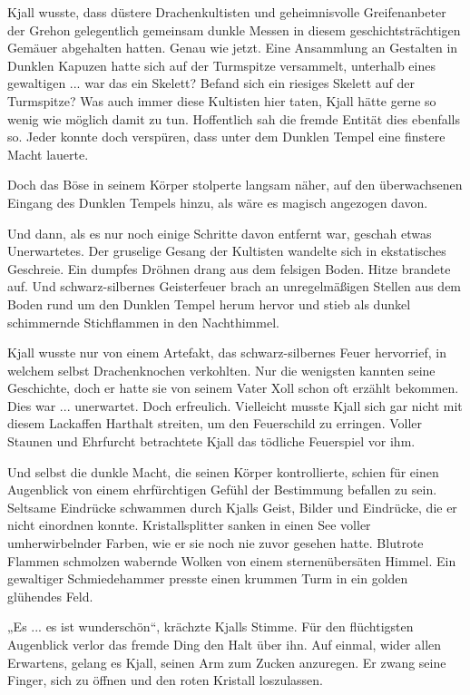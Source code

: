 Kjall wusste, dass düstere Drachenkultisten und geheimnisvolle Greifenanbeter der Grehon gelegentlich gemeinsam dunkle Messen in diesem geschichtsträchtigen Gemäuer abgehalten hatten. Genau wie jetzt. Eine Ansammlung an Gestalten in Dunklen Kapuzen hatte sich auf der Turmspitze versammelt, unterhalb eines gewaltigen ... war das ein Skelett? Befand sich ein riesiges Skelett auf der Turmspitze? Was auch immer diese Kultisten hier taten, Kjall hätte gerne so wenig wie möglich damit zu tun. Hoffentlich sah die fremde Entität dies ebenfalls so. Jeder konnte doch verspüren, dass unter dem Dunklen Tempel eine finstere Macht lauerte.

Doch das Böse in seinem Körper stolperte langsam näher, auf den überwachsenen Eingang des Dunklen Tempels hinzu, als wäre es magisch angezogen davon.

Und dann, als es nur noch einige Schritte davon entfernt war, geschah etwas Unerwartetes. Der gruselige Gesang der Kultisten wandelte sich in ekstatisches Geschreie. Ein dumpfes Dröhnen drang aus dem felsigen Boden. Hitze brandete auf. Und schwarz-silbernes Geisterfeuer brach an unregelmäßigen Stellen aus dem Boden rund um den Dunklen Tempel herum hervor und stieb als dunkel schimmernde Stichflammen in den Nachthimmel.

Kjall wusste nur von einem Artefakt, das schwarz-silbernes Feuer hervorrief, in welchem selbst Drachenknochen verkohlten. Nur die wenigsten kannten seine Geschichte, doch er hatte sie von seinem Vater Xoll schon oft erzählt bekommen. Dies war ... unerwartet. Doch erfreulich. Vielleicht musste Kjall sich gar nicht mit diesem Lackaffen Harthalt streiten, um den Feuerschild zu erringen. Voller Staunen und Ehrfurcht betrachtete Kjall das tödliche Feuerspiel vor ihm.

Und selbst die dunkle Macht, die seinen Körper kontrollierte, schien für einen Augenblick von einem ehrfürchtigen Gefühl der Bestimmung befallen zu sein. Seltsame Eindrücke schwammen durch Kjalls Geist, Bilder und Eindrücke, die er nicht einordnen konnte. Kristallsplitter sanken in einen See voller umherwirbelnder Farben, wie er sie noch nie zuvor gesehen hatte. Blutrote Flammen schmolzen wabernde Wolken von einem sternenübersäten Himmel. Ein gewaltiger Schmiedehammer presste einen krummen Turm in ein golden glühendes Feld.

„Es ... es ist wunderschön“, krächzte Kjalls Stimme. Für den flüchtigsten Augenblick verlor das fremde Ding den Halt über ihn. Auf einmal, wider allen Erwartens, gelang es Kjall, seinen Arm zum Zucken anzuregen. Er zwang seine Finger, sich zu öffnen und den roten Kristall loszulassen.

